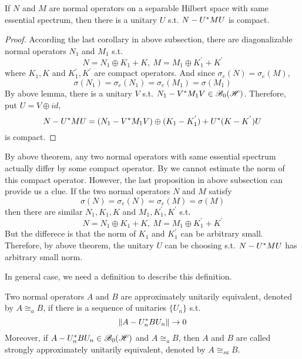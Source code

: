 \documentclass[a4paper,11pt]{report}
\begin{document}
\begin{thm}
	If $N$ and $M$ are normal operators on a separable Hilbert space with same essential spectrum, then there is a unitary $U$ s.t. $N-U^{*}MU$ is compact.
\end{thm}
\begin{proof}
	According the last corollary in above subsection, there are diagonalizable normal operators $N_1$ and $M_1$ s.t.
	\begin{equation*}
		N = N_1 \oplus K_1 + K, ~ M = M_1 \oplus K_1^{'} + K^{'}
	\end{equation*}
	where $K_1, K$ and $K_1^{'}, K^{'}$ are compact operators. And since $\sigma_e(N) = \sigma_e(M)$, 
	\begin{equation*}
		\sigma(N_1) = \sigma_e(N_1) = \sigma_e(M_1) = \sigma(M_1)
	\end{equation*}
	By above lemma, there is a unitary $V$ s.t. $N_1-V^{*}M_1V \in \mathscr{B}_{0}\mathscr{(H)}$. Therefore, put $U = V \oplus id$,
	\begin{equation*}
		N - U^{*}MU = (N_1-V^{*}M_1V) \oplus (K_1 - K_1^{'}) + U^{*}(K-K^{'})U 
	\end{equation*}
	is compact.
\end{proof}

By above theorem, any two normal operators with same essential spectrum actually differ by some compact operator. By we cannot estimate the norm of this compact operator. However, the last proposition in above subsection can provide us a clue. If the two normal operators $N$ and $M$ satisfy
\begin{equation*}
	\sigma(N) = \sigma_e(N) = \sigma_e(M) = \sigma(M)
\end{equation*}
then there are similar $N_1, K_1, K$ and $M_1,  K_1^{'}, K^{'}$ s.t.
\begin{equation*}
	N = N_1 \oplus K_1 + K, ~ M = M_1 \oplus K_1^{'} + K^{'}
\end{equation*}
But the differece is that the norm of $K_1$ and $K_1^{'}$ can be arbitrary small. Therefore, by above theorem, the unitary $U$ can be choosing s.t. $N - U^{*}MU$ has arbitrary small norm.

In general case, we need a definition to describe this definition.

\begin{defn}
	Two normal operators $A$ and $B$ are approximately unitarily equivalent, denoted by $A \cong_a B$, if there is a sequence of unitaries $\{U_n\}$ s.t. 
	\begin{equation*}
		\left\lVert A - U_n^{*}BU_n\right\lVert \rightarrow 0
	\end{equation*}
	Moreover, if $A - U_n^{*}BU_n \in \mathscr{B}_{0}\mathscr{(H)}$ and $A \cong_a B$, then $A$ and $B$ are called strongly approximately unitarily equivalent, denoted by $A \cong_{sa} B$.
\end{defn}
\end{document}

